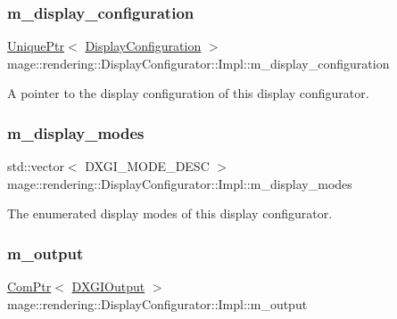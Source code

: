 \subsubsection{\texorpdfstring{m\+\_\+display\+\_\+configuration}{m\_display\_configuration}}
{\footnotesize\ttfamily \hyperlink{namespacemage_a3316d7143a973e37adf1110f2e80ca31}{Unique\+Ptr}$<$ \hyperlink{classmage_1_1rendering_1_1_display_configuration}{Display\+Configuration} $>$ mage\+::rendering\+::\+Display\+Configurator\+::\+Impl\+::m\+\_\+display\+\_\+configuration\hspace{0.3cm}{\ttfamily [private]}}

A pointer to the display configuration of this display configurator. \hypertarget{classmage_1_1rendering_1_1_display_configurator_1_1_impl_ae04d4e1430c684cb0961f838d040f6e1}{}\label{classmage_1_1rendering_1_1_display_configurator_1_1_impl_ae04d4e1430c684cb0961f838d040f6e1} 
\subsubsection{\texorpdfstring{m\+\_\+display\+\_\+modes}{m\_display\_modes}}
{\footnotesize\ttfamily std\+::vector$<$ D\+X\+G\+I\+\_\+\+M\+O\+D\+E\+\_\+\+D\+E\+SC $>$ mage\+::rendering\+::\+Display\+Configurator\+::\+Impl\+::m\+\_\+display\+\_\+modes\hspace{0.3cm}{\ttfamily [private]}}

The enumerated display modes of this display configurator. \hypertarget{classmage_1_1rendering_1_1_display_configurator_1_1_impl_accf774307783109a1e885efc5ec19a90}{}\label{classmage_1_1rendering_1_1_display_configurator_1_1_impl_accf774307783109a1e885efc5ec19a90} 
\subsubsection{\texorpdfstring{m\+\_\+output}{m\_output}}
{\footnotesize\ttfamily \hyperlink{namespacemage_ae74f374780900893caa5555d1031fd79}{Com\+Ptr}$<$ \hyperlink{namespacemage_1_1rendering_aaf22d3893277a4bd8497f6ea69b01532}{D\+X\+G\+I\+Output} $>$ mage\+::rendering\+::\+Display\+Configurator\+::\+Impl\+::m\+\_\+output\hspace{0.3cm}{\ttfamily [private]}}

